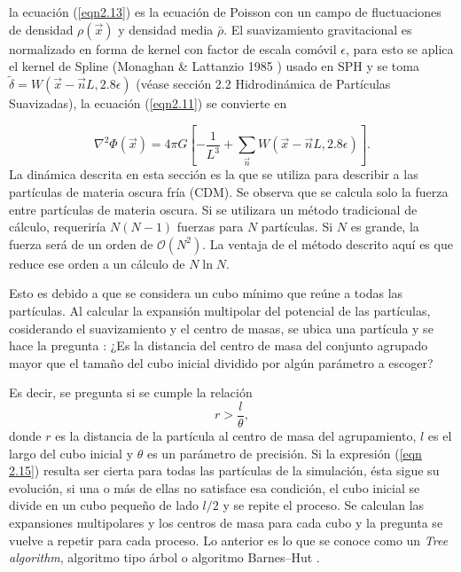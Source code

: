\documentclass[a4paper,openright,10pt, oneside, final]{book}
\begin{document}
la ecuación (\ref{eqn2.13}) es la ecuación de Poisson con un campo de fluctuaciones de densidad $\rho(\vec{x})$ y densidad media $\bar{\rho}$.
El suavizamiento gravitacional es normalizado en forma de kernel con factor de escala comóvil $\epsilon$, para esto se aplica el kernel de Spline (Monaghan \& Lattanzio 1985 \cite{b8.1}) usado en SPH y se toma $\tilde{\delta} = W(\vec{x}-\vec{n}L,2.8\epsilon)$ (véase sección 2.2 Hidrodinámica de Partículas Suavizadas), la ecuación (\ref{eqn2.11}) se convierte en

\begin{equation}
 \nabla^{2}\Phi(\vec{x})
 =
 4\pi G
 \left[
 -\frac{1}{L^{3}}
 +
 \sum_{\vec{n}}W(\vec{x}-\vec{n}L,2.8\epsilon)
 \right].
\end{equation}\label{eqn2.14}
La dinámica descrita en esta sección es la que se utiliza para describir a las partículas de materia oscura fría (CDM). Se observa que se calcula solo la fuerza entre partículas de materia oscura. Si se utilizara un método tradicional de cálculo,  requeriría $N(N-1)$ fuerzas para $N$ partículas. Si $N$ es grande, la fuerza será de un orden de $\mathcal{O}(N^{2})$. La ventaja de el método descrito aquí es que reduce ese orden a un cálculo de $N \ln N$. 

Esto es debido a que se considera un cubo mínimo que reúne a todas las partículas. Al calcular la expansión multipolar del potencial de las partículas, cosiderando el suavizamiento y el centro de masas, se ubica una partícula y se hace la pregunta : ¿Es la distancia del centro de masa del conjunto agrupado mayor que el tamaño del cubo inicial dividido por algún parámetro a escoger?

Es decir, se pregunta si se cumple la relación 
\begin{equation}
r > \frac{l}{\theta}, \label{eqn 2.15}
\end{equation}
donde $r$ es la distancia de la partícula al centro de masa del agrupamiento, $l$ es el largo del cubo inicial y $\theta$ es un parámetro de precisión. Si la expresión (\ref{eqn 2.15}) resulta ser cierta para todas las partículas de la simulación, ésta sigue su evolución, si una o más de ellas no satisface esa condición, el cubo inicial se divide en un cubo pequeño de lado $l/2$ y se repite el proceso. Se calculan las expansiones multipolares y los centros de masa para cada cubo y la pregunta se vuelve a repetir para cada proceso. Lo anterior es lo que se conoce como un \textit{Tree algorithm}, algoritmo tipo árbol o algoritmo Barnes--Hut \cite{b8.2}.
 
\end{document}
